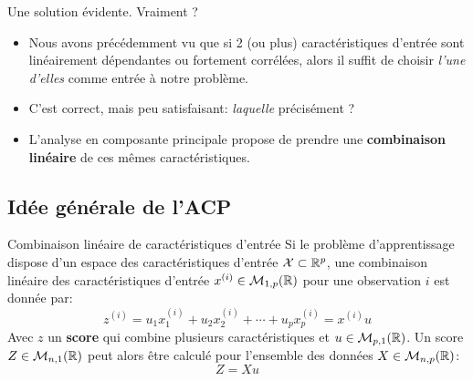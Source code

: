 \begin{frame}{Une solution évidente. Vraiment ?}
	\begin{itemize}
		\item Nous avons précédemment vu que si 2 (ou plus) caractéristiques d'entrée sont linéairement dépendantes ou fortement corrélées, alors il suffit de choisir \textit{l'une d'elles} comme entrée à notre problème.
		\pause
		\item C'est correct, mais peu satisfaisant: \textit{laquelle} précisément ?
		\pause
		\item L'analyse en composante principale propose de prendre une \textbf{combinaison linéaire} de ces mêmes caractéristiques.
	\end{itemize}
\end{frame}

\subsection[Idée générale de l'ACP]{Idée générale de l'ACP}

\begin{frame}{Combinaison linéaire de caractéristiques d'entrée}
	Si le problème d'apprentissage dispose d'un espace des caractéristiques d'entrée $\mathcal{X} \subset \mathbb{R}^p$, une combinaison linéaire des  caractéristiques d'entrée $x^{(i)} \in \mathcal{M}_{1,p}(\mathbb{R})$ pour une observation $i$ est donnée par:
	\begin{equation}
		z^{(i)} = u_1 x_1^{(i)} + u_2 x_2^{(i)} + \cdots + u_p x_p^{(i)} = x^{(i)} u
		\nonumber
	\end{equation}
	\pause
	Avec $z$ un \textbf{score} qui combine plusieurs caractéristiques et $u \in \mathcal{M}_{p,1}(\mathbb{R})$. Un score $Z \in \mathcal{M}_{n,1}(\mathbb{R})$ peut alors être calculé pour l'ensemble des données $X \in \mathcal{M}_{n,p}(\mathbb{R})$:
	\begin{equation}
		Z = X u
		\nonumber
	\end{equation}
\end{frame}

